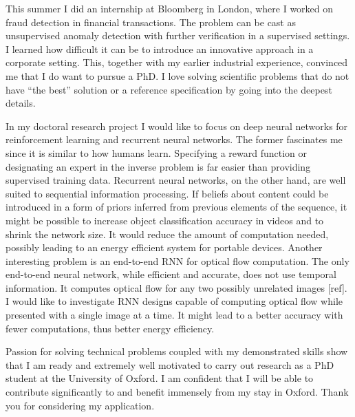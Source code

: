 \documentclass[12pt]{article}
\begin{document}
This summer I did an internship at Bloomberg in London, where I worked on fraud detection in financial transactions. The problem can be cast as unsupervised anomaly detection with further verification in a supervised settings. I learned how difficult it can be to introduce an innovative approach in a corporate setting. This, together with my earlier industrial experience, convinced me that I do want to pursue a PhD. I love solving scientific problems that do not have ``the best'' solution or a reference specification by going into the deepest details.

In my doctoral research project I would like to focus on deep neural networks for reinforcement learning and recurrent neural networks. The former fascinates me since it is similar to how humans learn. Specifying a reward function  or designating an expert in the inverse problem  is far easier than providing supervised training data. Recurrent neural networks, on the other hand, are well suited to sequential information processing. If beliefs about content could be introduced in a form of priors inferred from previous elements of the sequence, it might be possible to increase object classification accuracy in videos and to shrink the network size. It would reduce the amount of computation needed, possibly leading to an energy efficient system for portable devices. Another interesting problem is an end-to-end RNN for optical flow computation. The only end-to-end neural network, while efficient and accurate, does not use temporal information. It computes optical flow for any two possibly unrelated images [ref]. I would like to investigate RNN designs capable of computing optical flow while presented with a single image at a time. It might lead to a better accuracy with fewer computations, thus better energy efficiency.

Passion for solving technical problems coupled with my demonstrated skills show that I am ready and extremely well motivated to carry out research as a PhD student at the University of Oxford. I am confident that I will be able to contribute significantly to and benefit immensely from my stay in Oxford. Thank you for considering my application.
\end{document}
